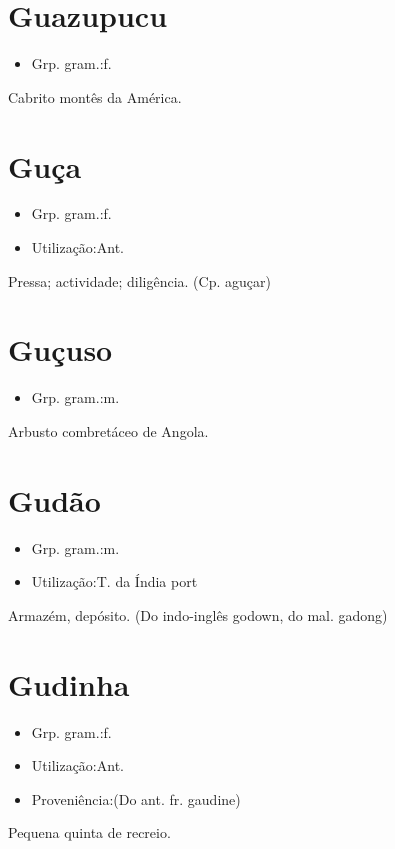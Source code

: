 \section{Guazupucu}
\begin{itemize}
\item {Grp. gram.:f.}
\end{itemize}
Cabrito montês da América.
\section{Guça}
\begin{itemize}
\item {Grp. gram.:f.}
\end{itemize}
\begin{itemize}
\item {Utilização:Ant.}
\end{itemize}
Pressa; actividade; diligência.
(Cp. \textunderscore aguçar\textunderscore )
\section{Guçuso}
\begin{itemize}
\item {Grp. gram.:m.}
\end{itemize}
Arbusto combretáceo de Angola.
\section{Gudão}
\begin{itemize}
\item {Grp. gram.:m.}
\end{itemize}
\begin{itemize}
\item {Utilização:T. da Índia port}
\end{itemize}
Armazém, depósito.
(Do indo-inglês \textunderscore godown\textunderscore , do mal. \textunderscore gadong\textunderscore )
\section{Gudinha}
\begin{itemize}
\item {Grp. gram.:f.}
\end{itemize}
\begin{itemize}
\item {Utilização:Ant.}
\end{itemize}
\begin{itemize}
\item {Proveniência:(Do ant. fr. \textunderscore gaudine\textunderscore )}
\end{itemize}
Pequena quinta de recreio.
